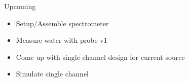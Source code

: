 \documentclass{ethpresentation}
\begin{document}
  \begin{frame}{Upcoming}
    \begin{itemize}
      \item Setup/Assemble spectrometer
      \item Measure water with probe v1
      \item Come up with single channel design for current source
      \item Simulate single channel
    \end{itemize}
  \end{frame}


\end{document}
